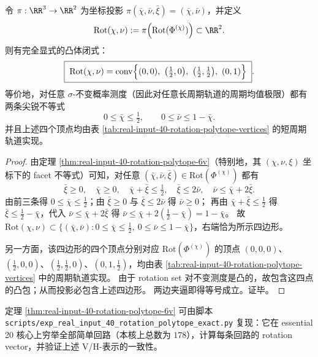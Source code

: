 \begin{corollary}\label{cor:real-input-40-rotation-set-chi-nu-quad}
令 \(\pi:\RR^3\to\RR^2\) 为坐标投影 \(\pi(\bar\chi,\bar\nu,\bar\xi)=(\bar\chi,\bar\nu)\)，并定义
\[
\mathrm{Rot}(\chi,\nu):=\pi\!\left(\mathrm{Rot}(\Phi^{(\chi)})\right)\subset\RR^2.
\]
则有完全显式的凸体闭式：
\[
\boxed{\;
\mathrm{Rot}(\chi,\nu)
=\mathrm{conv}\Bigl\{(0,0),\ \bigl(\tfrac12,0\bigr),\ \bigl(\tfrac12,\tfrac12\bigr),\ (0,1)\Bigr\}\; }.
\]
等价地，对任意 \(\sigma\)-不变概率测度（因此对任意长周期轨道的周期均值极限）都有两条尖锐不等式
\[
0\le \bar\chi\le \tfrac12,
\qquad
0\le \bar\nu\le 1-\bar\chi.
\]
并且上述四个顶点均由表 \ref{tab:real-input-40-rotation-polytope-vertices} 的短周期轨道实现。
\end{corollary}

\begin{proof}
由定理 \ref{thm:real-input-40-rotation-polytope-6v}（特别地，其 \((\chi,\nu,\xi)\) 坐标下的 facet 不等式）可知，对任意
\((\bar\chi,\bar\nu,\bar\xi)\in\mathrm{Rot}(\Phi^{(\chi)})\) 都有
\[
\bar\xi\ge 0,\quad
\bar\chi\ge 0,\quad
\bar\chi+\bar\xi\le \tfrac12,\quad
\bar\xi\le 2\bar\nu,\quad
\bar\nu\le \bar\chi+2\bar\xi.
\]
由前三条得 \(0\le \bar\chi\le \tfrac12\)；由 \(\bar\xi\ge 0\) 与 \(\bar\xi\le 2\bar\nu\) 得 \(\bar\nu\ge 0\)；
再由 \(\bar\chi+\bar\xi\le \tfrac12\) 得 \(\bar\xi\le \tfrac12-\bar\chi\)，代入 \(\bar\nu\le \bar\chi+2\bar\xi\) 得
\(\bar\nu\le \bar\chi+2(\tfrac12-\bar\chi)=1-\bar\chi\)。
故 \(\mathrm{Rot}(\chi,\nu)\subset\{(\bar\chi,\bar\nu):0\le \bar\chi\le \tfrac12,\ 0\le \bar\nu\le 1-\bar\chi\}\)，右端恰为所示四边形。

另一方面，该四边形的四个顶点分别对应 \(\mathrm{Rot}(\Phi^{(\chi)})\) 的顶点
\((0,0,0)\)、\((\tfrac12,0,0)\)、\((\tfrac12,\tfrac12,0)\)、\((0,1,\tfrac12)\)，均由表 \ref{tab:real-input-40-rotation-polytope-vertices} 中的周期轨道实现。
由于 rotation set 对不变测度是凸的，故包含这四点的凸包；从而投影必包含上述四边形。
两边夹逼即得等号成立。证毕。
\end{proof}

\begin{remark}\label{rem:real-input-40-rotation-polytope-exact-repro}
定理 \ref{thm:real-input-40-rotation-polytope-6v} 可由脚本 \texttt{scripts/exp\_real\_input\_40\_rotation\_polytope\_exact.py} 复现：它在 essential 20 核心上穷举全部简单回路（本核上总数为 \(178\)），计算每条回路的 rotation vector，并验证上述 V/H-表示的一致性。
\end{remark}


